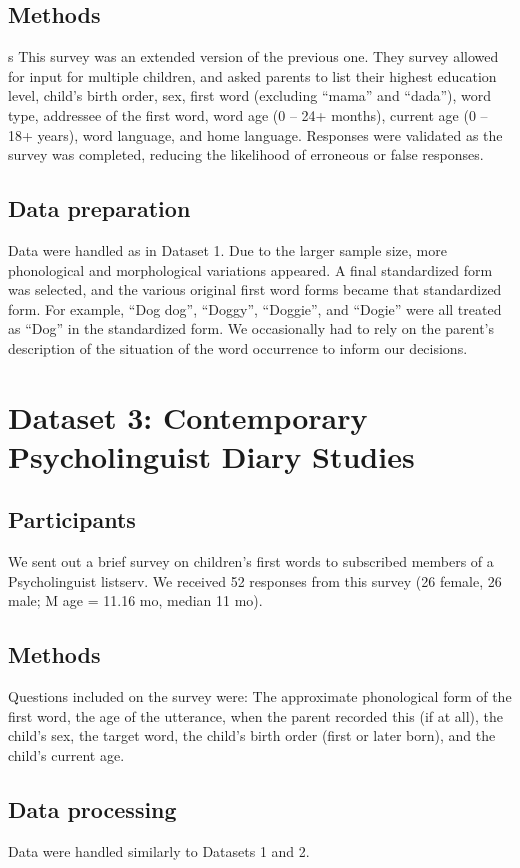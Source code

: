 \documentclass[10pt,letterpaper]{article}
\begin{document}
\subsection{Methods}s
This survey was an extended version of the previous one. They survey allowed for input for multiple children, and asked parents to list their highest education level, child's birth order, sex,  first word (excluding “mama” and “dada”), word type, addressee of the first word, word age (0 – 24+ months), current age (0 – 18+ years), word language, and home language.  Responses were validated as the survey was completed, reducing the likelihood of erroneous or false responses. 

\subsection{Data preparation}
Data were handled as in Dataset 1. Due to the larger sample size, more phonological and morphological variations appeared. A final standardized form was selected, and the various original first word forms became that standardized form. For example,  “Dog dog”, “Doggy”, “Doggie”, and “Dogie” were all treated as “Dog” in the standardized form. We occasionally had to rely on the parent’s description of the situation of the word occurrence to inform our decisions.

\section{Dataset 3: Contemporary Psycholinguist Diary Studies}

\subsection{Participants}
We sent out a brief survey on children's first words to subscribed members of a Psycholinguist listserv. We received 52 responses from this survey (26 female, 26 male; M age = 11.16 mo, median 11 mo).

\subsection{Methods}
Questions included on the survey were: The approximate phonological form of the  first word, the age of the utterance, when the parent recorded this (if at all), the child’s sex, the target word, the child’s birth order (first or later born), and the child’s current age. 

 \subsection{Data processing}
Data were handled similarly to Datasets 1 and 2. 
\end{document}
